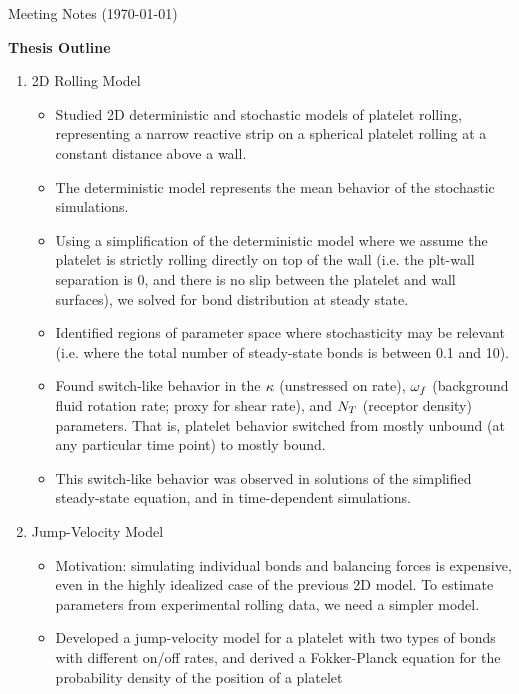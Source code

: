 \documentclass{article}
\begin{document}
\pagestyle{plain}

\begin{center}
  {\Large Meeting Notes (\today)}
\end{center}

\textbf{Thesis Outline}
\begin{enumerate}
\item 2D Rolling Model
  \begin{itemize}
  \item Studied 2D deterministic and stochastic models of platelet
    rolling, representing a narrow reactive strip on a spherical
    platelet rolling at a constant distance above a wall.
  \item The deterministic model represents the mean behavior of the
    stochastic simulations.
  \item Using a simplification of the deterministic model where we
    assume the platelet is strictly rolling directly on top of the
    wall (i.e. the plt-wall separation is 0, and there is no slip
    between the platelet and wall surfaces), we solved for bond
    distribution at steady state.
  \item Identified regions of parameter space where stochasticity may
    be relevant (i.e. where the total number of steady-state bonds is
    between 0.1 and 10).
  \item Found switch-like behavior in the $\kappa$ (unstressed on
    rate), $\omega_f$ (background fluid rotation rate; proxy for
    shear rate), and $N_T$ (receptor density)
    parameters. That is, platelet behavior switched from mostly
    unbound (at any particular time point) to mostly bound.
  \item This switch-like behavior was observed in solutions of the
    simplified steady-state equation, and in time-dependent
    simulations.
  \end{itemize}
\item Jump-Velocity Model
  \begin{itemize}
  \item Motivation: simulating individual bonds and balancing forces
    is expensive, even in the highly idealized case  of the previous
    2D model. To estimate parameters from experimental rolling data,
    we need a simpler model.
  \item Developed a jump-velocity model for a platelet with two types
    of bonds with different on/off rates, and derived a Fokker-Planck
    equation for the probability density of the position of a platelet

\end{itemize}
\end{enumerate}
\end{document}
